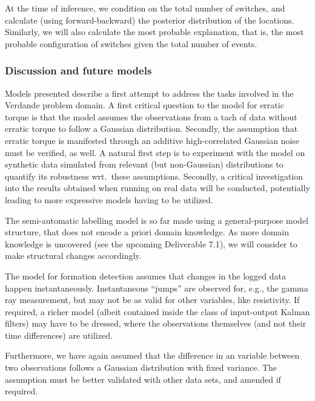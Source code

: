 At the time of inference, we condition on the total number of switches, and calculate (using forward-backward) the posterior distribution of the locations. Similarly, we will also calculate the most probable explanation, that is, the most probable configuration of switches given the total number of events.


\subsubsection{Discussion and future models}



Models presented describe a first attempt to address the tasks involved in the Verdande problem domain. A first critical question to the model for erratic torque is that the model assumes the observations from a tach of data without erratic torque to follow a Gaussian distribution. Secondly, the assumption that erratic torque is manifested through an additive high-correlated Gaussian noise must be verified, as well. A natural first step is to experiment with the model on synthetic data simulated from relevant (but non-Gaussian) distributions to quantify its robustness wrt.\ these assumptions. Secondly, a critical investigation into the results obtained when running on real data will be conducted, potentially leading to  more expressive models having to be utilized. 


The semi-automatic labelling model is so far made using a general-purpose model structure, that does not encode a priori domain knowledge. As more domain knowledge is uncovered (see the upcoming Deliverable 7.1), we will consider to make structural changes accordingly. 



The model for formation detection assumes that changes in the logged data happen instantaneously. Instantaneous ``jumps'' are observed for, e.g., the gamma ray measurement, but may not be as valid for other variables, like resistivity. If required, a richer model (albeit contained inside the class of input-output Kalman filters) may have to be dressed, where the observations themselves (and not their time differences) are utilized.

Furthermore, we have again  assumed that the difference in an variable between two observations follows a Gaussian distribution with fixed variance. The assumption must be better validated with other data sets, and amended if required.





